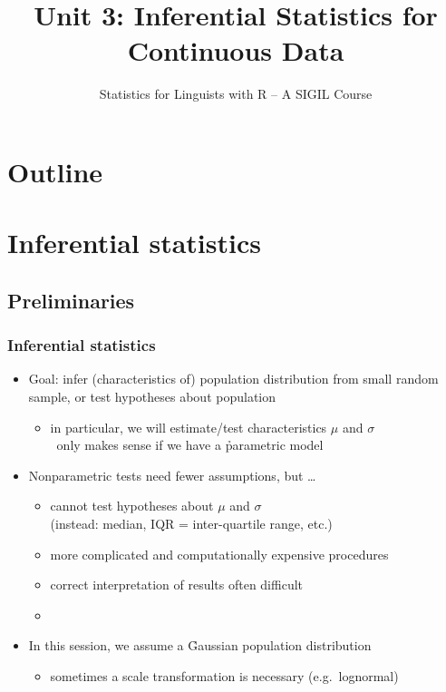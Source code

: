 \documentclass[handout,notes=show,t]{beamer} %
\title[3b.\ Continuous Data: Inference]{Unit 3: Inferential Statistics for Continuous Data}
\subtitle{Statistics for Linguists with R -- A SIGIL Course}
\date[sigil.r-forge.r-project.org]{%
  \light{\tiny \sigilcopyright}}
\begin{document}
\frame{\titlepage}


\section*{Outline}

\section{Inferential statistics}

\subsection{Preliminaries}

\begin{frame}
  \frametitle{Inferential statistics}

  \begin{itemize}
  \item Goal: infer (characteristics of) population distribution from small
    random sample, or test hypotheses about population
    \begin{itemize}
    \item in particular, we will estimate/test characteristics $\mu$ and $\sigma$\\
      \hand\ only makes sense if we have a \h{parametric} model
    \end{itemize}
  \item Nonparametric tests need fewer assumptions, but \ldots
    \begin{itemize}
    \item cannot test hypotheses about $\mu$ and $\sigma$\\
      (instead: median, IQR = inter-quartile range, etc.)
    \item more complicated and computationally expensive procedures
    \item correct interpretation of results often difficult
    \item[]
    \end{itemize}
  \item In this session, we assume a \h{Gaussian population} distribution%
    \begin{itemize}
    \item sometimes a scale transformation is necessary (e.g.\ lognormal)
    \end{itemize}
  \end{itemize}
\end{frame}
\end{document}
